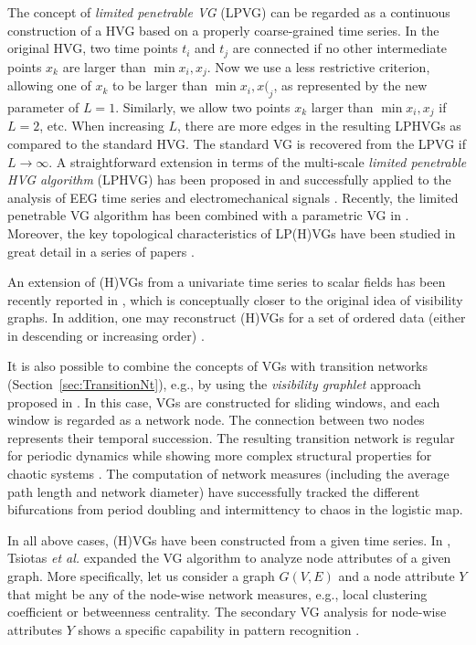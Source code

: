 		The concept of \emph{limited penetrable VG} (LPVG) \cite{Zhou2012,Gao2013e} can be regarded as a continuous construction of a HVG based on a properly coarse-grained time series. In the original HVG, two time points $t_i$ and $t_j$ are connected if no other intermediate points $x_k$ are larger than $\min{x_i, x_j}$. Now we use a less restrictive criterion, allowing one of $x_k$ to be larger than $\min{x_i, x(_j}$, as represented by the new parameter of $L=1$. Similarly, we allow two points $x_k$ larger than $\min{x_i, x_j}$ if $L = 2$, etc. When increasing $L$, there are more edges in the resulting LPHVGs as compared to the standard HVG. The standard VG is recovered from the LPVG if $L \to \infty$. A straightforward extension in terms of the multi-scale \emph{limited penetrable HVG algorithm} (LPHVG) has been proposed in \cite{Gao2016,Pei2014a} and successfully applied to the analysis of EEG time series \cite{Wang2016} and electromechanical signals \cite{Wang2016b}. Recently, the limited penetrable VG algorithm has been combined with a parametric VG in \cite{Li2018}. Moreover, the key topological characteristics of LP(H)VGs have been studied in great detail in a series of papers \cite{Wang2018,Wang2018b,Wang2018c}.
				
		An extension of (H)VGs from a univariate time series to scalar fields has been recently reported in \cite{Xiao2014a,Lacasa2017}, which is conceptually closer to the original idea of visibility graphs. In addition, one may reconstruct (H)VGs for a set of ordered data (either in descending or increasing order) \cite{Wang2015a}. 
						
		It is also possible to combine the concepts of VGs with transition networks (Section~\ref{sec:TransitionNt}), e.g., by using the \emph{visibility graphlet} approach proposed in \cite{Mutua2015,Mutua2016a}. In this case, VGs are constructed for sliding windows, and each window is regarded as a network node. The connection between two nodes represents their temporal succession. The resulting transition network is regular for periodic dynamics while showing more complex structural properties for chaotic systems \cite{Mutua2016a}. The computation of network measures (including the average path length and network diameter) have successfully tracked the different bifurcations from period doubling and intermittency to chaos in the logistic map. 
		
		In all above cases, (H)VGs have been constructed from a given time series. In \cite{Tsiotas2018}, Tsiotas {\textit {et al.}} expanded the VG algorithm to analyze node attributes of a given graph. More specifically, let us consider a graph $G(V, E)$ and a node attribute $Y$ that might be any of the node-wise network measures, e.g., local clustering coefficient or betweenness centrality. The secondary VG analysis for node-wise attributes $Y$ shows a specific capability in pattern recognition \cite{Tsiotas2018}. 
				
